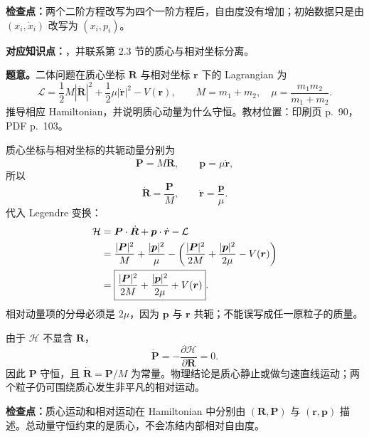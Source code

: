 \textbf{检查点：}两个二阶方程改写为四个一阶方程后，自由度没有增加；初始数据只是由 $(x_i,\dot x_i)$ 改写为 $(x_i,p_i)$。


\textbf{对应知识点：}，并联系第 2.3 节的质心与相对坐标分离。

\textbf{题意。}二体问题在质心坐标 $\bm R$ 与相对坐标 $\bm r$ 下的 Lagrangian 为
\begin{equation}
  \mathcal L
  =\frac12M|\dot{\bm R}|^2
  +\frac12\mu|\dot{\bm r}|^2
  -V(\bm r),
  \qquad
  M=m_1+m_2,
  \quad
  \mu=\frac{m_1m_2}{m_1+m_2}.
  \label{eq:QM-C02-S05-E04-lagrangian}
\end{equation}
推导相应 Hamiltonian，并说明质心动量为什么守恒。教材位置：印刷页 p.~90，PDF p.~103。

\begin{checkedsolution}
质心坐标与相对坐标的共轭动量分别为
\begin{equation}
  \bm P=M\dot{\bm R},
  \qquad
  \bm p=\mu\dot{\bm r},
  \label{eq:QM-C02-S05-E04-momenta}
\end{equation}
所以
\[
  \dot{\bm R}=\frac{\bm P}{M},
  \qquad
  \dot{\bm r}=\frac{\bm p}{\mu}.
\]
代入 Legendre 变换：
\begin{align}
  \mathcal H
  &=\bm P\cdot\dot{\bm R}
    +\bm p\cdot\dot{\bm r}-\mathcal L \notag\\
  &=\frac{|\bm P|^2}{M}+\frac{|\bm p|^2}{\mu}
    -\left(
      \frac{|\bm P|^2}{2M}
      +\frac{|\bm p|^2}{2\mu}
      -V(\bm r)
    \right) \notag\\
  &=\boxed{
    \frac{|\bm P|^2}{2M}
    +\frac{|\bm p|^2}{2\mu}
    +V(\bm r)}.
  \label{eq:QM-C02-S05-E04-hamiltonian}
\end{align}
相对动量项的分母必须是 $2\mu$，因为 $\bm p$ 与 $\bm r$ 共轭；不能误写成任一原粒子的质量。

由于 $\mathcal H$ 不显含 $\bm R$，
\begin{equation}
  \dot{\bm P}
  =-\frac{\partial\mathcal H}{\partial\bm R}=0.
  \label{eq:QM-C02-S05-E04-total-momentum}
\end{equation}
因此 $\bm P$ 守恒，且 $\dot{\bm R}=\bm P/M$ 为常量。物理结论是质心静止或做匀速直线运动；两个粒子仍可围绕质心发生非平凡的相对运动。
\end{checkedsolution}

\textbf{检查点：}质心运动和相对运动在 Hamiltonian 中分别由 $(\bm R,\bm P)$ 与 $(\bm r,\bm p)$ 描述。总动量守恒约束的是质心，不会冻结内部相对自由度。


